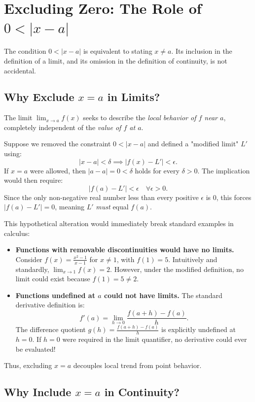 \documentclass{essay}
\begin{document}
\section{Excluding Zero: The Role of $0 < |x - a|$}

The condition $0 < |x - a|$ is equivalent to stating $x \neq a$. Its inclusion in the definition of a limit, and its omission in the definition of continuity, is not accidental.

\subsection{Why Exclude $x = a$ in Limits?}

The limit $\lim_{x \to a} f(x)$ seeks to describe the \emph{local behavior of $f$ near $a$}, completely independent of the \emph{value of $f$ at $a$}.

Suppose we removed the constraint $0 < |x - a|$ and defined a "modified limit" $L'$ using:
\[
|x - a| < \delta \implies |f(x) - L'| < \epsilon.
\]
If $x = a$ were allowed, then $|a - a| = 0 < \delta$ holds for every $\delta > 0$. The implication would then require:
\[
|f(a) - L'| < \epsilon \quad \forall \epsilon > 0.
\]
Since the only non-negative real number less than every positive $\epsilon$ is $0$, this forces $|f(a) - L'| = 0$, meaning $L'$ \emph{must} equal $f(a)$.

This hypothetical alteration would immediately break standard examples in calculus:
\begin{itemize}
    \item \textbf{Functions with removable discontinuities would have no limits.} Consider $f(x) = \frac{x^2 - 1}{x - 1}$ for $x \neq 1$, with $f(1) = 5$. Intuitively and standardly, $\lim_{x \to 1} f(x) = 2$. However, under the modified definition, no limit could exist because $f(1) = 5 \neq 2$.
    \item \textbf{Functions undefined at $a$ could not have limits.} The standard derivative definition is:
    \[
    f'(a) = \lim_{h \to 0} \frac{f(a+h) - f(a)}{h}.
    \]
    The difference quotient $g(h) = \frac{f(a+h) - f(a)}{h}$ is explicitly undefined at $h = 0$. If $h = 0$ were required in the limit quantifier, no derivative could ever be evaluated!
\end{itemize}

Thus, excluding $x = a$ decouples local trend from point behavior.

\subsection{Why Include $x = a$ in Continuity?}
\end{document}
